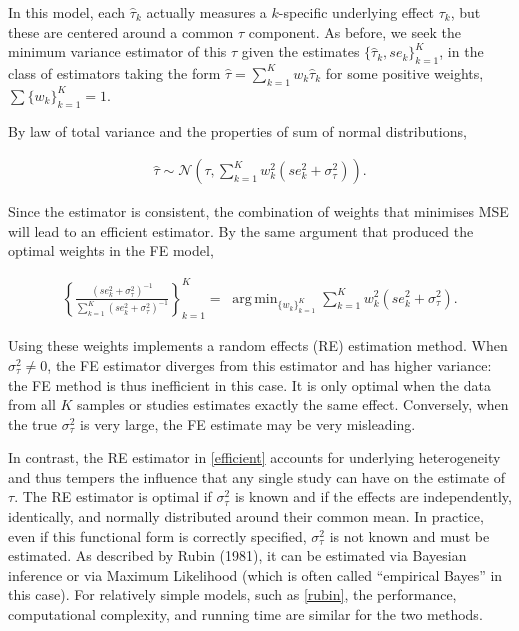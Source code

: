 \documentclass[12pt]{article}
\DeclareMathOperator*{\argmin}{arg\,min}
\begin{document}
In this model, each $\hat{\tau}_k$ actually measures a $k$-specific underlying effect $\tau_k$, but these are centered around a common $\tau$ component. As before, we seek the minimum variance estimator of this $\tau$ given the estimates $\{\hat{\tau}_k, se_k\}_{k=1}^K$, in the class of estimators taking the form  $\hat{\tau} = \sum_{k=1}^{K} w_k \hat{\tau}_k$ for some positive weights, $\sum \{w_k\}_{k=1}^K =1$. 

By law of total variance and the properties of sum of normal distributions,

\begin{equation}
\begin{aligned}
\hat{\tau} \sim \mathcal{N}(\tau, \sum_{k=1}^{K} w_k^2( se^2_{k} + \sigma^2_{\tau})).
\end{aligned}
\end{equation}


Since the estimator is consistent, the combination of weights that minimises MSE will lead to an efficient estimator. By the same argument that produced the optimal weights in the FE model, 

 \begin{equation}\label{efficient}
\begin{aligned}
\left\{ \frac{(se^2_k+ \sigma^2_{\tau})^{-1}}{\sum_{k=1}^K(se^2_k+ \sigma^2_{\tau})^{-1}} \right\}_{k=1}^K = \; \argmin_{ \{w_k\}_{k=1}^K  } \sum_{k=1}^{K} w_k^2 (se^2_{k}+ \sigma^2_{\tau}).
\end{aligned}
\end{equation}

Using these weights implements a random effects (RE) estimation method. When $\sigma^2_{\tau} \neq 0$, the FE estimator diverges from this estimator and has higher variance: the FE method is thus inefficient in this case. It is only optimal when the data from all $K$ samples or studies estimates exactly the same effect. Conversely, when the true $\sigma^2_{\tau}$ is very large, the FE estimate may be very misleading. 

In contrast, the RE estimator in \eqref{efficient} accounts for underlying heterogeneity and thus tempers the influence that any single study can have on the estimate of $\tau$. The RE estimator is optimal if $\sigma^2_{\tau}$ is known and if the effects are independently, identically, and normally distributed around their common mean. 
In practice, even if this functional form is correctly specified, $\sigma^2_{\tau}$ is not known and must be estimated. As described by Rubin (1981), it can be estimated via Bayesian inference or via Maximum Likelihood (which is often called ``empirical Bayes'' in this case). For relatively simple models, such as \eqref{rubin}, the performance, computational complexity, and running time are similar for the two methods. 
\end{document}
